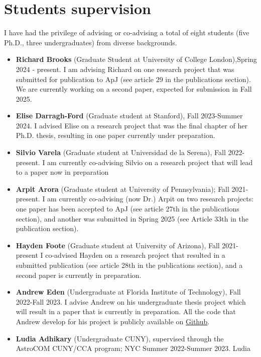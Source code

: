 \documentclass[14pt]{article}
\begin{document}
\section*{Students supervision}
I have had the privilege of advising or co-advising a total of eight students
(five Ph.D., three undergraduates) from diverse backgrounds. 


\begin{itemize}
  \setlength\itemsep{0.0em}
  \renewcommand\labelitemi{$\cdot$}
  \item \textbf{Richard Brooks} (Graduate Student at University of College
    London),Spring 2024 - present. I am advising Richard on one research project that
    was submitted for publication to ApJ (see article 29 in the publications
    section). We are currently working on a second paper, expected for
    submission in Fall 2025.
  \item \textbf{Elise Darragh-Ford} (Graduate student at Stanford), Fall 2023-Summer
    2024. I advised Elise on a research project that was the  final chapter of her Ph.D. thesis, 
    resulting in one paper currently under preparation.  
  \item \textbf{Silvio Varela} (Graduate student at Universidad de la Serena), Fall 2022-present. I am currently 
    co-advising Silvio on a research project that will lead to a paper now in preparation
  \item \textbf{Arpit Arora} (Graduate student at University of Pennsylvania);
    Fall 2021-present. I am currently co-advising (now Dr.) Arpit on two
    research projects: one paper has been accepted to ApJ (see article 27th in
    the publications section), and another was submitted in Spring 2025 (see
    Article 33th in the publication section).
  \item \textbf{Hayden Foote} (Graduate student at University of Arizona), Fall
    2021-present I co-advised Hayden on a research project that resulted in a
    submitted publication (see article 28th in the publications section), and a second paper 
    is currently in preparation.
  \item \textbf{Andrew Eden} (Undergraduate at Florida Institute of Technology),
    Fall 2022-Fall 2023. I advise Andrew on his undergraduate thesis project which
    will result in a paper that is currently in preparation. All the code that
    Andrew develop for his project is publicly available on \href{https://github.com/aeden2019/rubin_mw_mocks}{Github}. 
  \item \textbf{Ludia Adhikary} (Undergraduate CUNY), supervised through the AstroCOM CUNY/CCA program; NYC Summer 2022-Summer 2023. Ludia

\end{itemize}
\end{document}
